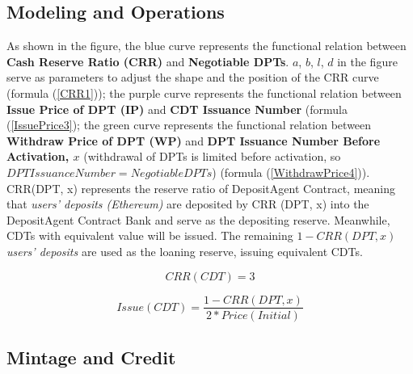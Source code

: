 \documentclass[a4paper, 10pt, conference]{ieeeconf} %
\begin{document}
\subsection{Modeling and Operations}
As shown in the figure, the blue curve represents the functional relation between \textbf{Cash Reserve Ratio (CRR)} and \textbf{Negotiable DPTs}. $a$, $b$, $l$, $d$ in the figure serve as parameters to adjust the shape and the position of the CRR curve (formula (\ref{CRR1})); the purple curve represents the functional relation between \textbf{Issue Price of DPT (IP)} and \textbf{CDT Issuance Number} (formula (\ref{IssuePrice3}); the green curve represents the functional relation between \textbf{Withdraw Price of DPT (WP)} and \textbf{DPT Issuance Number Before Activation, $x$} (withdrawal of DPTs is limited before activation, so ${ DPT Issuance Number = Negotiable DPTs}$) (formula (\ref{WithdrawPrice4})). CRR(DPT, x) represents the reserve ratio of DepositAgent Contract, meaning that \emph{users' deposits (Ethereum)} are deposited by CRR (DPT, x) into the DepositAgent Contract Bank and serve as the depositing reserve. Meanwhile, CDTs with equivalent value will be issued. The remaining ${1 - CRR(DPT, x)}$ \emph{users' deposits} are used as the loaning reserve, issuing equivalent CDTs. 

\begin{equation}\label{CRR5}
{CRR(CDT) = 3}
\end{equation}

\begin{equation}\label{Issue7}
{Issue(CDT) = \frac{1 - CRR(DPT, x)}{2 * Price(Initial)}}
\end{equation}

\subsection{Mintage and Credit}
\end{document}
